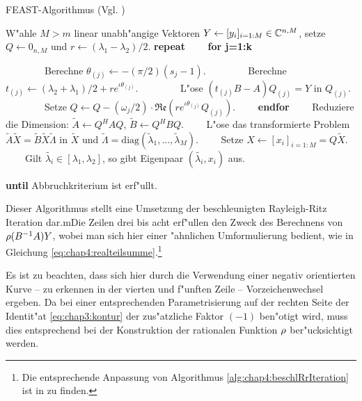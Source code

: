 \begin{algorithm}
\caption{FEAST-Algorithmus (Vgl. \cite[Abschnitt III]{polizzi})}\label{alg:chap4:feast}
\begin{algorithmic}[1]
\State W"ahle $M > m$ linear unabh"angige Vektoren $Y \gets [y_i]_{i=1:M} \in\mathbb{C}^{n,M}$, setze $Q\gets 0_{n,M}$ und $r\gets (\lambda_1 - \lambda_2)/2$.
\State \textbf{repeat}
\State \ \ \ \ \textbf{for j=1:k}

\State \ \ \ \ \ \ \ \ Berechne $\theta_{(j)} \gets -(\pi/2)(s_j-1)$.
\State \ \ \ \ \ \ \ \ Berechne $t_{(j)} \gets (\lambda_2 + \lambda_1)/2 + re^{\iota\theta_{(j)}}$.
\State \ \ \ \ \ \ \ \ L"ose $(t_{(j)} B-A)Q_{(j)} = Y$ in $Q_{(j)}$.
\State \ \ \ \ \ \ \ \ Setze $Q\gets Q - (\omega_j/2)\cdot\mathfrak{Re}\left(re^{\iota \theta_{(j)}} Q_{(j)}\right)$.
\State \ \ \ \ \textbf{endfor}
\State \ \ \ \ Reduziere die Dimension: $\widetilde{A} \gets Q^H A Q$,
$\widetilde{B} \gets Q^H B Q$.
\State \ \ \ \ L"ose das transformierte Problem $\widetilde{A}\widetilde{X}
= \widetilde{B}\widetilde{X}\widetilde{\Lambda}$ in
$\widetilde{X}$ und $\widetilde{\Lambda} = \text{diag}(\widetilde{\lambda}_1,\ldots,\widetilde{\lambda}_M)$.
\State \ \ \ \ Setze $X \gets [x_i]_{i=1:M} = Q\widetilde{X}$.
\State \ \ \ \ Gilt $\widetilde{\lambda_i} \in [\lambda_1,\lambda_2]$, so gibt Eigenpaar $(\widetilde{\lambda_i},x_i)$ aus.

\State \textbf{until} Abbruchkriterium ist erf"ullt.
\end{algorithmic}
\end{algorithm}

Dieser Algorithmus stellt eine Umsetzung der beschleunigten Rayleigh-Ritz Iteration dar.mDie Zeilen drei bis acht erf"ullen den Zweck des Berechnens von $\rho(B^{-1}A)Y$, wobei man sich hier einer "ahnlichen Umformulierung bedient, wie in Gleichung \eqref{eq:chap4:realteilsumme}.\footnote{Die entsprechende Anpassung von Algorithmus \ref{alg:chap4:beschlRrIteration} ist in \cite[365]{ptep} zu finden.}

\newpage

Es ist zu beachten, dass sich hier durch die Verwendung einer negativ orientierten Kurve -- zu erkennen in der vierten und f"unften Zeile -- Vorzeichenwechsel ergeben. Da bei einer entsprechenden Parametrisierung auf der rechten Seite der Identit"at \eqref{eq:chap3:kontur} der zus"atzliche Faktor $(-1)$ ben"otigt wird, muss dies entsprechend bei der Konstruktion der rationalen Funktion $\rho$ ber"ucksichtigt werden.\\


